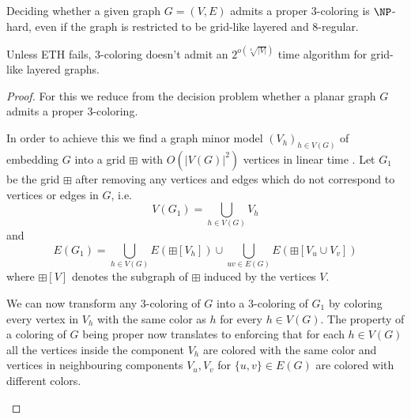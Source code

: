 \begin{lemma}
    \label{lem:gridlikehardnessregular}
    Deciding whether a given graph $G = (V, E)$ admits a proper $3$-coloring is $\NP$-hard, even if the graph is restricted to be grid-like layered and $8$-regular.
    
    Unless ETH fails, $3$-coloring doesn't admit an $2^{o\left(\sqrt[4]{|V|}\right)}$ time algorithm for grid-like layered graphs.
\end{lemma}
\begin{proof}
    For this we reduce from the decision problem whether a planar graph $G$ admits a proper $3$-coloring.

    In order to achieve this we find a graph minor model $(V_h)_{h\in V(G)}$ of embedding $G$ into a grid $\boxplus$ with $O(|V(G)|^2)$ vertices in linear time \cite{tamassia1989planar}.
    Let $G_1$ be the grid $\boxplus$ after removing any vertices and edges which do not correspond to vertices or edges in $G$, i.e.
    \[
        V(G_1) = \bigcup_{h \in V(G)} V_h
    \]
        and
    \[
        E(G_1) = \bigcup_{h \in V(G)} E(\boxplus[V_h]) \cup \bigcup_{uv \in E(G)} E(\boxplus[V_u \cup V_v])
    \]
    where $\boxplus[V]$ denotes the subgraph of $\boxplus$ induced by the vertices $V$.

    We can now transform any $3$-coloring of $G$ into a $3$-coloring of $G_1$ by coloring every vertex in $V_h$ with the same color as $h$ for every $h \in V(G)$.
    The property of a coloring of $G$ being proper now translates to enforcing that for each $h \in V(G)$ all the vertices inside the component $V_h$ are colored with the same color and vertices in neighbouring components $V_u, V_v$ for $\{u,v\} \in E(G)$ are colored with different colors.

    \begin{figure}[tpb]
        \centering
\end{figure}
\end{proof}
